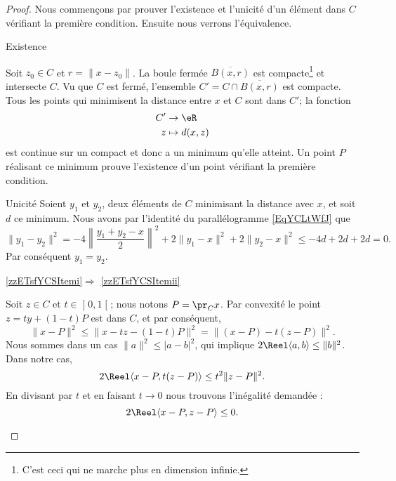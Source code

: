 \begin{proof}
    Nous commençons par prouver l'existence et l'unicité d'un élément dans \( C\) vérifiant la première condition. Ensuite nous verrons l'équivalence. 

    \begin{subproof}
        \item[Existence]
        
            Soit \( z_0\in C\) et \( r=\| x-z_0 \|\). La boule fermée \( \overline{ B(x,r) }\) est compacte\footnote{C'est ceci qui ne marche plus en dimension infinie.} et intersecte \( C\). Vu que \( C\) est fermé, l'ensemble \( C'=C\cap\overline{ B(x,r) }\) est compacte. Tous les points qui minimisent la distance entre \( x\) et \( C\) sont dans \( C'\); la fonction 
            \begin{equation}
                \begin{aligned}
                     C'&\to \eR \\
                    z&\mapsto d(x,z) 
                \end{aligned}
            \end{equation}
            est continue sur un compact et donc a un minimum qu'elle atteint. Un point \( P\) réalisant ce minimum prouve l'existence d'un point vérifiant la première condition.

        \item[Unicité]
            Soient \( y_1\) et \( y_2\), deux éléments de \( C\) minimisant la distance avec \( x\), et soit \( d\) ce minimum. Nous avons par l'identité du parallélogramme \eqref{EqYCLtWfJ} que
            \begin{equation}
                \| y_1-y_2 \|^2=-4\left\| \frac{ y_1+y_2-x }{2} \right\|^2+2\| y_1-x \|^2+2\| y_2-x \|^2\leq -4d+2d+2d=0.
            \end{equation}
            Par conséquent \( y_1=y_2\).

        \item[\ref{zzETsfYCSItemi}\( \Rightarrow\) \ref{zzETsfYCSItemii}]

            Soit \( z\in C\) et \( t\in \mathopen] 0 , 1 \mathclose[\); nous notons \( P=\pr_Cx\). Par convexité le point \( z=ty+(1-t)P\) est dans \( C\), et par conséquent,
                \begin{equation}
                    \| x-P \|^2\leq\| x-tz-(1-t)P \|^2=\| (x-P)-t(z-P) \|^2.
                \end{equation}
                Nous sommes dans un cas \( \| a \|^2\leq | a-b |^2\), qui implique \( 2\Reel\langle a, b\rangle \leq \| b \|^2\). Dans notre cas,
                \begin{equation}
                    2\Reel\langle x-P , t(z-P)\rangle \leq t^2\| z-P \|^2.
                \end{equation}
                En divisant par \( t\) et en faisant \( t\to 0\) nous trouvons l'inégalité demandée :
                \begin{equation}
                    2\Reel\langle x-P, z-P\rangle \leq 0.
                \end{equation}
                

\end{subproof}
\end{proof}
